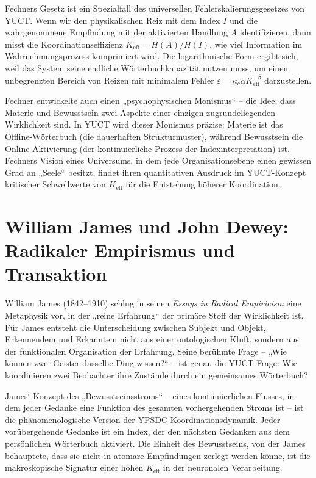 \documentclass[12pt,a4paper]{article}
\begin{document}
	Fechners Gesetz ist ein Spezialfall des universellen Fehlerskalierungsgesetzes von YUCT. Wenn wir den physikalischen Reiz mit dem Index \(I\) und die wahrgenommene Empfindung mit der aktivierten Handlung \(A\) identifizieren, dann misst die Koordinationseffizienz \(K_{\mathrm{eff}} = H(A)/H(I)\), wie viel Information im Wahrnehmungsprozess komprimiert wird. Die logarithmische Form ergibt sich, weil das System seine endliche Wörterbuchkapazität nutzen muss, um einen unbegrenzten Bereich von Reizen mit minimalem Fehler \(\varepsilon = \kappa_c \alpha K_{\mathrm{eff}}^{-\beta}\) darzustellen.
	
	Fechner entwickelte auch einen „psychophysischen Monismus“ – die Idee, dass Materie und Bewusstsein zwei Aspekte einer einzigen zugrundeliegenden Wirklichkeit sind. In YUCT wird dieser Monismus präzise: Materie ist das Offline-Wörterbuch (die dauerhaften Strukturmuster), während Bewusstsein die Online-Aktivierung (der kontinuierliche Prozess der Indexinterpretation) ist. Fechners Vision eines Universums, in dem jede Organisationsebene einen gewissen Grad an „Seele“ besitzt, findet ihren quantitativen Ausdruck im YUCT-Konzept kritischer Schwellwerte von \(K_{\mathrm{eff}}\) für die Entstehung höherer Koordination.
	
	\section{William James und John Dewey: Radikaler Empirismus und Transaktion}
	
	William James (1842–1910) schlug in seinen \emph{Essays in Radical Empiricism} eine Metaphysik vor, in der „reine Erfahrung“ der primäre Stoff der Wirklichkeit ist. Für James entsteht die Unterscheidung zwischen Subjekt und Objekt, Erkennendem und Erkanntem nicht aus einer ontologischen Kluft, sondern aus der funktionalen Organisation der Erfahrung. Seine berühmte Frage – „Wie können zwei Geister dasselbe Ding wissen?“ – ist genau die YUCT-Frage: Wie koordinieren zwei Beobachter ihre Zustände durch ein gemeinsames Wörterbuch?
	
	James‘ Konzept des „Bewusstseinsstroms“ – eines kontinuierlichen Flusses, in dem jeder Gedanke eine Funktion des gesamten vorhergehenden Stroms ist – ist die phänomenologische Version der YPSDC-Koordinationsdynamik. Jeder vorübergehende Gedanke ist ein Index, der den nächsten Gedanken aus dem persönlichen Wörterbuch aktiviert. Die Einheit des Bewusstseins, von der James behauptete, dass sie nicht in atomare Empfindungen zerlegt werden könne, ist die makroskopische Signatur einer hohen \(K_{\mathrm{eff}}\) in der neuronalen Verarbeitung.
	
\end{document}
